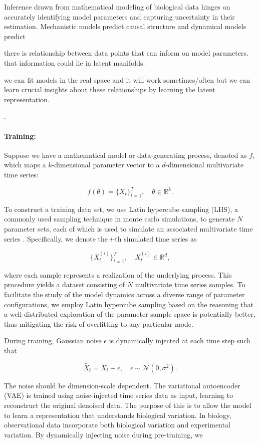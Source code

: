 \documentclass[12pt]{article} %
\newcommand{\para}[1]{\vspace*{-4.5mm}\paragraph{#1}}
\newcommand{\blue}[1]{{\color{magenta}{#1}}}
\begin{document}
Inference drawn from mathematical modeling of biological data hinges on accurately identifying model parameters and capturing uncertainty in their estimation.
Mechanistic models predict causal structure and dynamical models predict

there is relationship between data points that can inform on model parameters. that information could lie in latent manifolds. 

we can fit models in the real space and it will work sometimes/often but we can learn crucial insights about these relationships by learning the latent representation.

\blue{simulation based inference}.

\para{Training:}
Suppose we have a mathematical model or data-generating process, denoted as \( f \), which maps a \( k \)-dimensional parameter vector to a \( d \)-dimensional multivariate time series:  

$$
f(\theta) = \{X_t\}_{t=1}^T, \quad \theta \in \mathbb{R}^k.
$$  

To construct a training data set, we use Latin hypercube sampling (LHS), a commonly used sampling technique in monte carlo simulations, to generate \( N \)  parameter sets, each of which is used to simulate an associated multivariate time series \citep{}. Specifically, we denote the \( i \)-th simulated time series as  

$$
\{X_{t}^{(i)}\}_{t=1}^T, \quad X_t^{(i)} \in \mathbb{R}^d,
$$  

where each sample represents a realization of the underlying process. This procedure yields a dataset consisting of \( N \) multivariate time series samples. To facilitate the study of the model dynamics across a diverse range of parameter configurations, we employ Latin hypercube sampling based on the reasoning that a well-distributed exploration of the parameter sample space is potentially better, thus mitigating the risk of overfitting to any particular mode\citep{mckay2000comparison}. 

During training, Gaussian noise \( \epsilon \) is dynamically injected at each time step such that  

$$
\tilde{X_t} = X_t + \epsilon, \quad \epsilon \sim \mathcal{N}(0, \sigma^2).
$$  

The noise should be dimension-scale dependent. The variational autoencoder (VAE) is trained using noise-injected time series data as input, learning to reconstruct the original denoised data. The purpose of this is to allow the model to learn a representation that understands biological variation. In biology, observational data incorporate both biological variation and experimental variation. By dynamically injecting noise during pre-training, we
\end{document}
